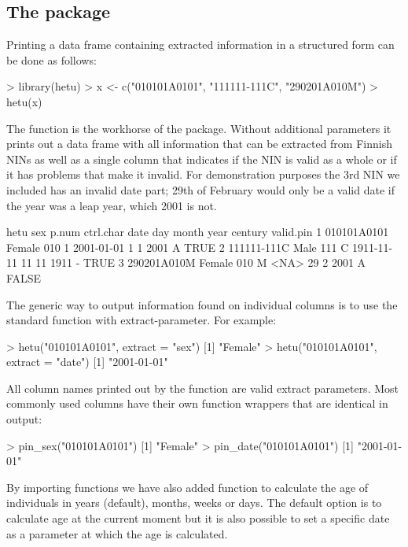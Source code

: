 \subsection{The  package}

Printing a data frame containing extracted information in a structured form can be done as follows:

\begin{example}
 > library(hetu)
 > x <- c("010101A0101", "111111-111C", "290201A010M")
 > hetu(x)
\end{example}

The  function is the workhorse of the  package. Without additional parameters it prints out a data frame with all information that can be extracted from Finnish NINs as well as a single column that indicates if the NIN is valid as a whole or if it has problems that make it invalid. For demonstration purposes the 3rd NIN we included has an invalid date part; 29th of February would only be a valid date if the year was a leap year, which 2001 is not.

\begin{example}
         hetu    sex p.num ctrl.char       date day month year century valid.pin
1 010101A0101 Female   010         1 2001-01-01   1     1 2001       A      TRUE
2 111111-111C   Male   111         C 1911-11-11  11    11 1911       -      TRUE
3 290201A010M Female   010         M       <NA>  29     2 2001       A     FALSE
\end{example}

The generic way to output information found on individual columns is to use the standard  function with extract-parameter. For example:

\begin{example}
  > hetu("010101A0101", extract = "sex")
  [1] "Female"
  > hetu("010101A0101", extract = "date")
  [1] "2001-01-01"
\end{example}

All column names printed out by the  function are valid extract parameters. Most commonly used columns have their own function wrappers that are identical in output:

\begin{example}
  > pin_sex("010101A0101")
  [1] "Female"
  > pin_date("010101A0101")
  [1] "2001-01-01"
\end{example}

By importing  \citep{lubridate} functions we have also added  function to calculate the age of individuals in years (default), months, weeks or days. The default option is to calculate age at the current moment but it is also possible to set a specific date as a parameter at which the age is calculated.

